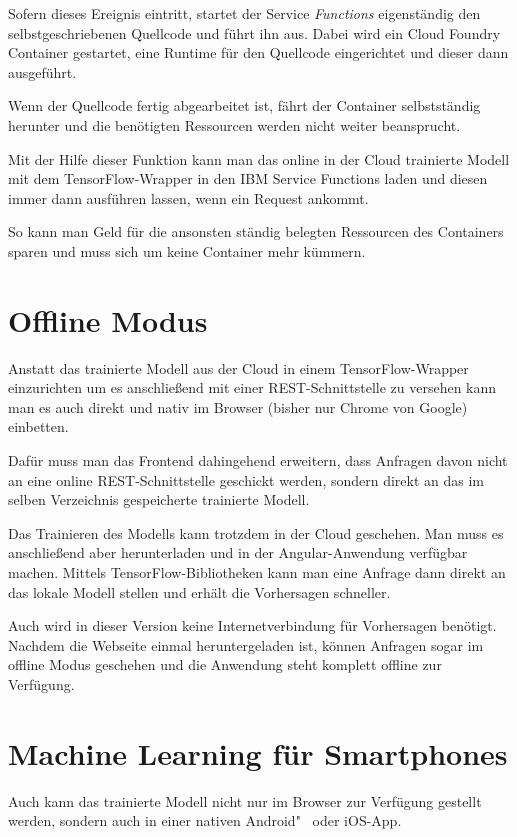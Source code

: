 Sofern dieses Ereignis eintritt, startet der Service \textit{Functions} eigenständig den selbstgeschriebenen Quellcode
und führt ihn aus. Dabei wird ein Cloud Foundry Container gestartet, eine Runtime für den Quellcode eingerichtet und
dieser dann ausgeführt.

Wenn der Quellcode fertig abgearbeitet ist, fährt der Container selbstständig herunter und die benötigten Ressourcen
werden nicht weiter beansprucht.

Mit der Hilfe dieser Funktion kann man das online in der Cloud trainierte Modell mit dem TensorFlow-Wrapper in den IBM
Service Functions laden und diesen immer dann ausführen lassen, wenn ein Request ankommt.

So kann man Geld für die ansonsten ständig belegten Ressourcen des Containers sparen und muss sich um keine Container
mehr kümmern.

\section{Offline Modus}
Anstatt das trainierte Modell aus der Cloud in einem TensorFlow-Wrapper einzurichten um es anschließend mit einer
REST-Schnittstelle zu versehen kann man es auch direkt und nativ im Browser (bisher nur Chrome von Google) einbetten.

Dafür muss man das Frontend dahingehend erweitern, dass Anfragen davon nicht an eine online REST-Schnittstelle geschickt
werden, sondern direkt an das im selben Verzeichnis gespeicherte trainierte Modell.

Das Trainieren des Modells kann trotzdem in der Cloud geschehen. Man muss es anschließend aber herunterladen und in der
Angular-Anwendung verfügbar machen. Mittels TensorFlow-Bibliotheken kann man eine Anfrage dann direkt an das lokale
Modell stellen und erhält die Vorhersagen schneller.

Auch wird in dieser Version keine Internetverbindung für Vorhersagen benötigt. Nachdem die Webseite einmal
heruntergeladen ist, können Anfragen sogar im offline Modus geschehen und die Anwendung steht komplett offline zur
Verfügung.

\section{Machine Learning für Smartphones}
Auch kann das trainierte Modell nicht nur im Browser zur Verfügung gestellt werden, sondern auch in einer nativen
Android"~ oder iOS-App.

